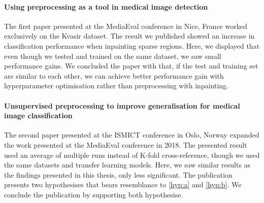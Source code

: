 \paragraph{Using preprocessing as a tool in medical image detection~\cite{Mathias2018MediaevalPaper}}
The first paper presented at the MediaEval conference in Nice, France worked exclusively on the Kvasir dataset. The result we published showed an increase in classification performance when inpainting sparse regions. 
Here, we displayed that even though we tested and trained on the same dataset, we saw small performance gains. We concluded the paper with that, if the test and training set are similar to each other, we can achieve better performance gain with hyperparameter optimisation rather than preprocessing with inpainting. 


\paragraph{Unsupervised preprocessing to improve generalisation for medical image classification~\cite{Mathias2019IEEpaper}}
The second paper presented at the ISMICT conference in Oslo, Norway expanded the work presented at the MediaEval conference in 2018.
The presented result used an average of multiple runs instead of K-fold cross-reference, though we used the same datasets and transfer learning models.
Here, we saw similar results as the findings presented in this thesis, only less significant. The publication presents two hypothesises that bears resemblance to \ref{hyp:a} and \ref{hyp:b}. We conclude the publication by supporting both hypothesise.




